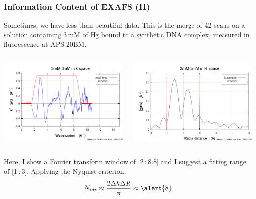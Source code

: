 \documentclass[10pt, xcolor=x11names, compress]{beamer}
\begin{document}
\begin{frame}
  \frametitle{Information Content of EXAFS (II)}
  \small
  Sometimes, we have less-than-beautiful data.  This is the merge of 42
  scans on a solution containing 3\,mM of Hg bound to a synthetic DNA
  complex, measured in fluorescence at APS 20BM.
  \begin{columns}
    \begin{column}{0.5\linewidth}
      \begin{center}
        \includegraphics[width=0.8\linewidth]{info/hgdna_chik.png}
      \end{center}
    \end{column}
    \begin{column}{0.5\linewidth}
      \begin{center}
        \includegraphics[width=0.8\linewidth]{info/hgdna_chir.png}
      \end{center}
    \end{column}
  \end{columns}
  Here, I show a Fourier transform window of [2\,:\,8.8] and I suggest a
  fitting range of [1\,:\,3].  Applying the Nyquist criterion:
  \begin{equation}
    \notag N_{idp} \approx \frac{2\Delta k\Delta R}{\pi} \approx \alert{8}
  \end{equation}


\end{frame}
\end{document}
